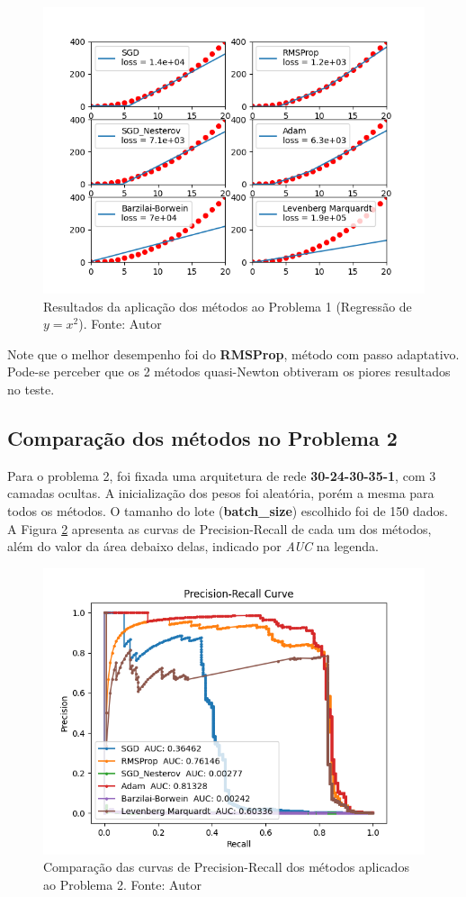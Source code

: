 \documentclass[11pt]{article}
\begin{document}
\begin{figure}[H]
\center
\includegraphics[scale=0.7]{Figuras/REG.png}
\caption{Resultados da aplicação dos métodos ao Problema 1 (Regressão de  $y = x^2$). Fonte: Autor} 
\label{REG}
\end{figure}

Note que o melhor desempenho foi do \textbf{RMSProp}, método com passo adaptativo. Pode-se perceber que os 2 métodos quasi-Newton obtiveram os piores resultados no teste.


\subsection*{Comparação dos métodos no Problema 2}
Para o problema 2, foi fixada uma arquitetura de rede \textbf{30-24-30-35-1}, com 3 camadas ocultas. A inicialização dos pesos foi aleatória, porém a mesma para todos os métodos. O tamanho do lote (\textbf{batch\_size}) escolhido foi de 150 dados.
A Figura \ref{FRAUD} apresenta as curvas de Precision-Recall de cada um dos métodos, além do valor da área debaixo delas, indicado por \textit{AUC} na legenda.

\begin{figure}[H]
\center
\includegraphics[scale=0.8]{Figuras/FRAUD.png}
\caption{Comparação das curvas de Precision-Recall dos métodos aplicados ao Problema 2. Fonte: Autor} 
\label{FRAUD}
\end{figure}
\end{document}

